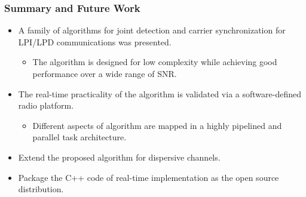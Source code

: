  


  \begin{frame}
    \frametitle{Summary and Future Work}
    \begin{itemize}
      \item A family of algorithms for joint detection and carrier synchronization for LPI/LPD communications was presented.
      \begin{itemize}
        \item The algorithm is designed for low complexity while achieving good performance over a wide range of SNR.
      \end{itemize}
      \item The real-time practicality of the algorithm is validated via a software-defined radio platform.
      \begin{itemize}
        \item Different aspects of algorithm are mapped in a highly pipelined and parallel task architecture.
      \end{itemize}
      \item Extend the proposed algorithm for dispersive channels.
      \item Package the C++ code of real-time implementation as the open source distribution.
    \end{itemize}
      
  \end{frame} 